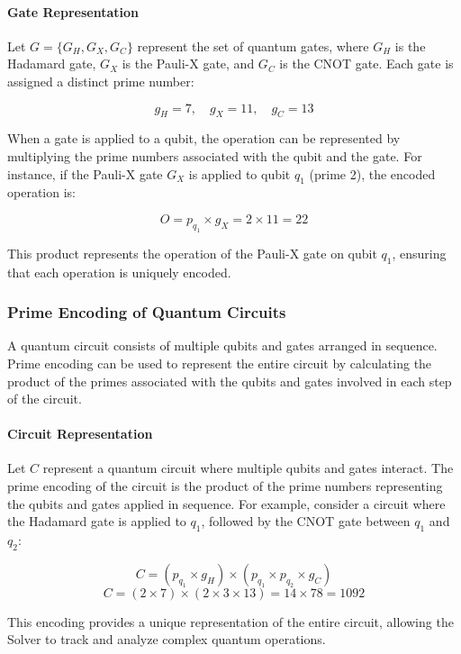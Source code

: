 \documentclass[%
 preprint, linenumbers,
 amsmath,amssymb,
 aps, physrev,
]{revtex4-2}
\begin{document}
\paragraph{Gate Representation}

Let \( G = \{G_H, G_X, G_C\} \) represent the set of quantum gates, where \( G_H \) is the Hadamard gate, \( G_X \) is the Pauli-X gate, and \( G_C \) is the CNOT gate. Each gate is assigned a distinct prime number:

\[
g_H = 7, \quad g_X = 11, \quad g_C = 13
\]

When a gate is applied to a qubit, the operation can be represented by multiplying the prime numbers associated with the qubit and the gate. For instance, if the Pauli-X gate \( G_X \) is applied to qubit \( q_1 \) (prime 2), the encoded operation is:

\[
O = p_{q_1} \times g_X = 2 \times 11 = 22
\]

This product represents the operation of the Pauli-X gate on qubit \( q_1 \), ensuring that each operation is uniquely encoded.

\subsubsection{Prime Encoding of Quantum Circuits}

A quantum circuit consists of multiple qubits and gates arranged in sequence. Prime encoding can be used to represent the entire circuit by calculating the product of the primes associated with the qubits and gates involved in each step of the circuit.

\paragraph{Circuit Representation}

Let \( C \) represent a quantum circuit where multiple qubits and gates interact. The prime encoding of the circuit is the product of the prime numbers representing the qubits and gates applied in sequence. For example, consider a circuit where the Hadamard gate is applied to \( q_1 \), followed by the CNOT gate between \( q_1 \) and \( q_2 \):

\[
C = (p_{q_1} \times g_H) \times (p_{q_1} \times p_{q_2} \times g_C)
\]
\[
C = (2 \times 7) \times (2 \times 3 \times 13) = 14 \times 78 = 1092
\]

This encoding provides a unique representation of the entire circuit, allowing the Solver to track and analyze complex quantum operations.
\end{document}
